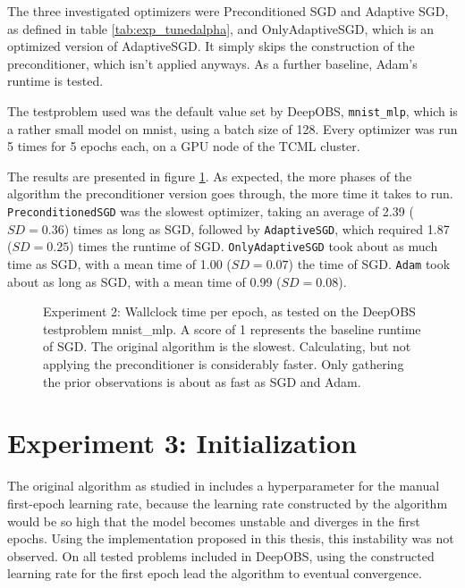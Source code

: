 \documentclass[twoside,12pt,a4paper]{report}
\begin{document}
The three investigated optimizers were Preconditioned SGD and Adaptive SGD, as defined in table \ref{tab:exp_tunedalpha}, and OnlyAdaptiveSGD, which is an optimized version of AdaptiveSGD. It simply skips the construction of the preconditioner, which isn't applied anyways.
As a further baseline, Adam's runtime is tested.

The testproblem used was the default value set by DeepOBS, \verb|mnist_mlp|, which is a rather small model on mnist, using a batch size of 128. Every optimizer was run 5 times for 5 epochs each, on a GPU node of the TCML cluster.

The results are presented in figure \ref{fig:exp_perf_prec}. As expected, the more phases of the algorithm the preconditioner version goes through, the more time it takes to run.
\verb|PreconditionedSGD| was the slowest optimizer, taking an average of 2.39 ($SD = 0.36$) times as long as SGD, followed by \verb|AdaptiveSGD|, which required 1.87 ($SD = 0.25$) times the runtime of SGD. \verb|OnlyAdaptiveSGD| took about as much time as SGD, with a mean time of 1.00 ($SD = 0.07$) the time of SGD. \verb|Adam| took about as long as SGD, with a mean time of 0.99 ($SD = 0.08$).

\begin{figure}
	\centering \hspace{-1,5cm}
	
	\caption{Experiment 2: Wallclock time per epoch, as tested on the DeepOBS testproblem mnist\_mlp. A score of 1 represents the baseline runtime of SGD. The original algorithm is the slowest. Calculating, but not applying the preconditioner is considerably faster. Only gathering the prior observations is about as fast as SGD and Adam.}
	\label{fig:exp_perf_prec}
	
\end{figure}


\section{Experiment 3: Initialization}
The original algorithm as studied in \cite{roos2019active} includes a hyperparameter for the manual first-epoch learning rate, because the learning rate constructed by the algorithm would be so high that the model becomes unstable and diverges in the first epochs.
Using the implementation proposed in this thesis, this instability was not observed. On all tested problems included in DeepOBS, using the constructed learning rate for the first epoch lead the algorithm to eventual convergence.
\end{document}
